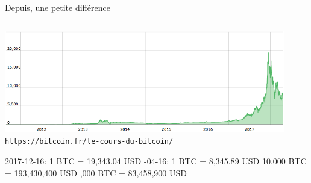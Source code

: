 

\begin{frame}{\vskip -0.1cm\Large Depuis, une petite diff\'erence}

\begin{columns}
\column{\dimexpr\paperwidth-1pt}

\begin{center}
\vskip -0.2cm
\includegraphics[width=12.25cm]{graphics/bitcoin-price-chart-fr.png}
\vskip 0.05cm
{\small\texttt{https://bitcoin.fr/le-cours-du-bitcoin/}}%

\vskip 0.5cm
{\normalsize 2017-12-16: 1 BTC = 19,343.04 USD
\quad{}-04-16: 1 BTC = 8,345.89 USD}
\vskip -0.05cm
{\footnotesize10,000 BTC = 193,430,400 USD
,000 BTC = 83,458,900 USD}
\end{center}

\end{columns}

\normalsize
\end{frame}

